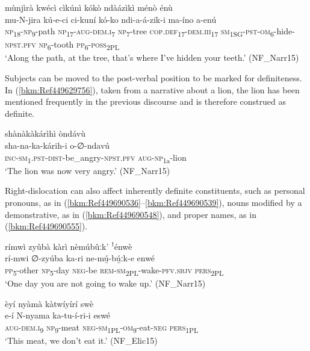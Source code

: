 \ea
\label{bkm:Ref449629532}
mùnjìrà kwécì cìkúnì kókò ndàázìkì ménò énù\\
\gll mu-N-jira    kú-e-ci    ci-kuní  kó-ko ndi-a-á-zik-i        ma-íno  a-enú  \\
\textsc{np}\textsubscript{18}-\textsc{np}\textsubscript{9}-path  \textsc{np}\textsubscript{17}-\textsc{aug}-\textsc{dem}.\textsc{i}\textsubscript{7}  \textsc{np}\textsubscript{7}-tree  \textsc{cop}.\textsc{def}\textsubscript{17}-\textsc{dem}.\textsc{iii}\textsubscript{17}
\textsc{sm}\textsubscript{1SG}-\textsc{pst}-\textsc{om}\textsubscript{6}-hide-\textsc{npst}.\textsc{pfv}  \textsc{np}\textsubscript{6}-tooth  \textsc{pp}\textsubscript{6}-\textsc{poss}\textsubscript{2PL}\\
\glt ‘Along the path, at the tree, that’s where I’ve hidden your teeth.’ (NF\_Narr15)
\z

Subjects can be moved to the post-verbal position to be marked for definiteness. In (\ref{bkm:Ref449629756}), taken from a narrative about a lion, the lion has been mentioned frequently in the previous discourse and is therefore construed as definite.

\ea
shànàkàkárìhì òndávù\\
\gll sha-na-ka-kárih-i        o-∅-ndavú\\
\textsc{inc}-\textsc{sm}\textsubscript{1}.\textsc{pst}-\textsc{dist}-be\_angry-\textsc{npst}.\textsc{pfv}  \textsc{aug}-\textsc{np}\textsubscript{1a}-lion\\
\glt ‘The lion was now very angry.’ (NF\_Narr15)\label{bkm:Ref449629756}
\z

Right-dislocation can also affect inherently definite constituents, such as personal pronouns, as in (\ref{bkm:Ref449690536}--\ref{bkm:Ref449690539}), nouns modified by a demonstrative, as in (\ref{bkm:Ref449690548}), and proper names, as in (\ref{bkm:Ref449690555}).

\ea
\label{bkm:Ref449690536}
rímwì zyûbà kàrì nèmúbûːk’ ꜝénwè\\
\gll rí-mwi  ∅-zyúba  ka-ri    ne-mú̲-bú̲ːk-e    enwé\\
\textsc{pp}\textsubscript{5}-other  \textsc{np}\textsubscript{5}-day  \textsc{neg}-be  \textsc{rem}-\textsc{sm}\textsubscript{2PL}-wake-\textsc{pfv}.\textsc{sbjv}  \textsc{pers}\textsubscript{2PL}\\
\glt ‘One day you are not going to wake up.’ (NF\_Narr15)
\z

\ea
\label{bkm:Ref449690539}
èyí nyàmà kàtwíyírí swè\\
\gll e-í    N-nyama  ka-tu-í-ri-i      eswé\\
\textsc{aug}-\textsc{dem}.\textsc{i}\textsubscript{9}  \textsc{np}\textsubscript{9}-meat  \textsc{neg}-\textsc{sm}\textsubscript{1PL}-\textsc{om}\textsubscript{9}-eat-\textsc{neg}  \textsc{pers}\textsubscript{1PL}\\
\glt ‘This meat, we don’t eat it.’ (NF\_Elic15)
\z

